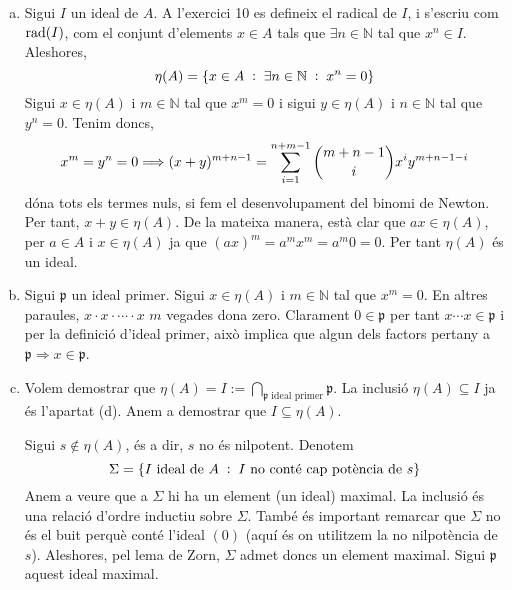 \documentclass[../main.tex]{subfiles}
\begin{document}
\begin{sol}
\begin{enumerate}[(a)]
    
    \item Sigui $I$ un ideal de $A$. A l'exercici 10 es defineix el radical de $I$, i s'escriu com $\operatorname{\mathrm{rad}}(I)$, com el conjunt d'elements $x\in A$ tals que $\exists n\in\mathbb{N}$ tal que $x^n\in I$. Aleshores,
    \begin{equation}
        \notag
        \eta(A) = \{x\in A\;:\;\exists n\in\mathbb{N}\;:\;x^n=0\}
    \end{equation}
    Sigui $x\in \eta(A)$ i $m\in \mathbb{N}$ tal que $x^m = 0$ i sigui $y\in \eta(A)$ i $n\in \mathbb{N}$ tal que $y^n = 0$. Tenim doncs,
    \begin{equation}
        \notag
        x^m=y^n=0 \Longrightarrow (x+y)^{m+n-1} = \sum_{i=1}^{n+m-1}\binom{m+n-1}{i}x^{i}y^{m+n-1-i}
    \end{equation}
    dóna tots els termes nuls, si fem el desenvolupament del binomi de Newton. Per tant, $x+y\in\eta(A)$. De la mateixa manera, està clar que $ax\in \eta(A)$, per $a\in A$ i $x\in \eta(A)$ ja que $(ax)^m =a^mx^m = a^m0 = 0$. Per tant $\eta(A)$ és un ideal.
    
    
    
    
    \item Sigui $\mathfrak{p}$ un ideal primer. Sigui $x\in \eta(A)$ i $m\in \mathbb{N}$ tal que $x^m = 0$. En altres paraules, $x\cdotp x\cdotp \cdots\cdotp x$ $m$ vegades dona zero. Clarament $0\in\mathfrak{p}$ per tant $x\cdots x\in \mathfrak{p}$ i per la definició d'ideal primer, això implica que algun dels factors pertany a $\mathfrak{p}\Rightarrow x\in\mathfrak{p}$.
    
    
    \item Volem demostrar que $\eta(A) = I:= \bigcap_{\mathfrak{p}\text{ ideal primer}}\mathfrak{p}$. La inclusió $\eta(A)\subseteq I$ ja és l'apartat (d). Anem a demostrar que $I\subseteq \eta(A)$. 
    
    Sigui $s\not\in \eta(A)$, és a dir, $s$ no és nilpotent. Denotem
    \begin{equation}
        \notag
        \Sigma = \{I \text{ ideal de }A\;:\;I\text{ no conté cap potència de }s\}
    \end{equation}
    Anem a veure que a $\Sigma$ hi ha un element (un ideal) maximal. La inclusió és una relació d'ordre inductiu sobre $\Sigma$. També és important remarcar que $\Sigma$ no és el buit perquè conté l'ideal $(0)$ (aquí és on utilitzem la no nilpotència de $s$). Aleshores, pel lema de Zorn, $\Sigma$ admet doncs un element maximal. Sigui $\mathfrak{p}$ aquest ideal maximal.
    

\end{enumerate}
\end{sol}
\end{document}
